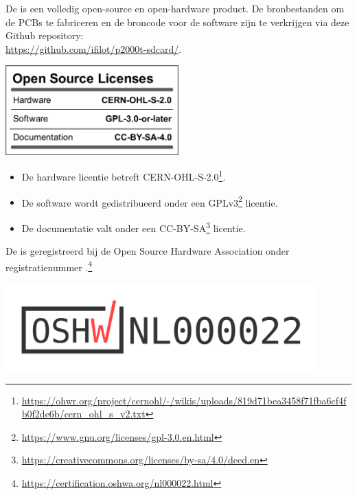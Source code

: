 
De \product is een volledig open-source en open-hardware product. De bronbestanden om de PCBs te fabriceren en de broncode voor de software zijn te verkrijgen via deze Github repository:\\ \faGithub \;\url{https://github.com/ifilot/p2000t-sdcard/}.

\begin{center}
    \includegraphics[width=0.5\textwidth]{img/oshw_facts.png}
\end{center}

\begin{itemize}
    \item De hardware licentie betreft CERN-OHL-S-2.0\footnote{\url{https://ohwr.org/project/cernohl/-/wikis/uploads/819d71bea3458f71fba6cf4fb0f2de6b/cern_ohl_s_v2.txt}}.
    \item De software wordt gedistribueerd onder een GPLv3\footnote{\url{https://www.gnu.org/licenses/gpl-3.0.en.html}} licentie.
    \item De documentatie valt onder een CC-BY-SA\footnote{\url{https://creativecommons.org/licenses/by-sa/4.0/deed.en}} licentie.
\end{itemize}

\newpage

De \product is geregistreerd bij de Open Source Hardware Association onder registratienummer .\footnote{\url{https://certification.oshwa.org/nl000022.html}}

\begin{center}
    \includegraphics[width=0.9\textwidth]{img/certification-mark-NL000022-wide.png}
\end{center}